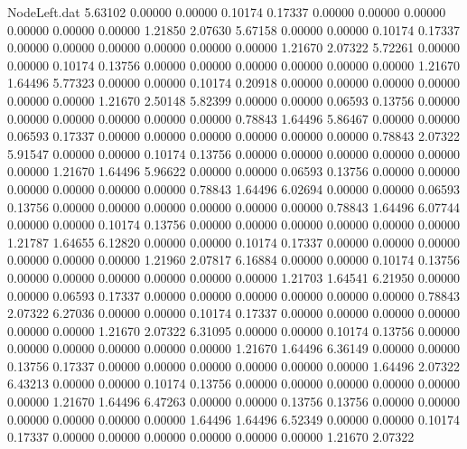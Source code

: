 \begin{filecontents}{NodeLeft.dat}
   5.63102    0.00000    0.00000     0.10174    0.17337    0.00000    0.00000    0.00000    0.00000    0.00000    0.00000    1.21850    2.07630
   5.67158    0.00000    0.00000     0.10174    0.17337    0.00000    0.00000    0.00000    0.00000    0.00000    0.00000    1.21670    2.07322
   5.72261    0.00000    0.00000     0.10174    0.13756    0.00000    0.00000    0.00000    0.00000    0.00000    0.00000    1.21670    1.64496
   5.77323    0.00000    0.00000     0.10174    0.20918    0.00000    0.00000    0.00000    0.00000    0.00000    0.00000    1.21670    2.50148
   5.82399    0.00000    0.00000     0.06593    0.13756    0.00000    0.00000    0.00000    0.00000    0.00000    0.00000    0.78843    1.64496
   5.86467    0.00000    0.00000     0.06593    0.17337    0.00000    0.00000    0.00000    0.00000    0.00000    0.00000    0.78843    2.07322
   5.91547    0.00000    0.00000     0.10174    0.13756    0.00000    0.00000    0.00000    0.00000    0.00000    0.00000    1.21670    1.64496
   5.96622    0.00000    0.00000     0.06593    0.13756    0.00000    0.00000    0.00000    0.00000    0.00000    0.00000    0.78843    1.64496
   6.02694    0.00000    0.00000     0.06593    0.13756    0.00000    0.00000    0.00000    0.00000    0.00000    0.00000    0.78843    1.64496
   6.07744    0.00000    0.00000     0.10174    0.13756    0.00000    0.00000    0.00000    0.00000    0.00000    0.00000    1.21787    1.64655
   6.12820    0.00000    0.00000     0.10174    0.17337    0.00000    0.00000    0.00000    0.00000    0.00000    0.00000    1.21960    2.07817
   6.16884    0.00000    0.00000     0.10174    0.13756    0.00000    0.00000    0.00000    0.00000    0.00000    0.00000    1.21703    1.64541
   6.21950    0.00000    0.00000     0.06593    0.17337    0.00000    0.00000    0.00000    0.00000    0.00000    0.00000    0.78843    2.07322
   6.27036    0.00000    0.00000     0.10174    0.17337    0.00000    0.00000    0.00000    0.00000    0.00000    0.00000    1.21670    2.07322
   6.31095    0.00000    0.00000     0.10174    0.13756    0.00000    0.00000    0.00000    0.00000    0.00000    0.00000    1.21670    1.64496
   6.36149    0.00000    0.00000     0.13756    0.17337    0.00000    0.00000    0.00000    0.00000    0.00000    0.00000    1.64496    2.07322
   6.43213    0.00000    0.00000     0.10174    0.13756    0.00000    0.00000    0.00000    0.00000    0.00000    0.00000    1.21670    1.64496
   6.47263    0.00000    0.00000     0.13756    0.13756    0.00000    0.00000    0.00000    0.00000    0.00000    0.00000    1.64496    1.64496
   6.52349    0.00000    0.00000     0.10174    0.17337    0.00000    0.00000    0.00000    0.00000    0.00000    0.00000    1.21670    2.07322

\end{filecontents}
